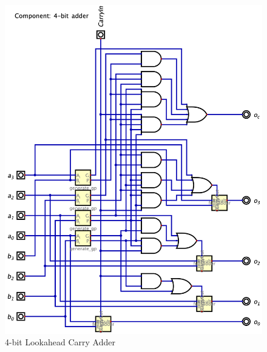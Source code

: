 \documentclass[conference]{IEEEtran}
\begin{document}
\begin{figure}[h!]
    \centering
    \includegraphics[width=\textwidth]{assets/adder_4bits.png}
    \caption{4-bit Lookahead Carry Adder}
    \label{fig:lca}
    \end{figure}
\end{document}
